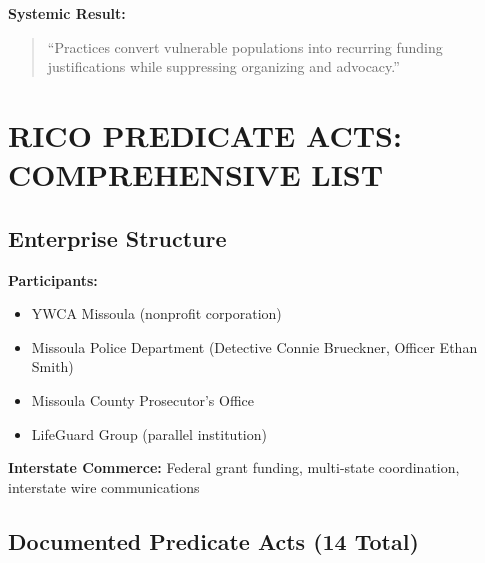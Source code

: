 \documentclass[11pt,letterpaper]{article}
\begin{document}
\textbf{Systemic Result:}
\begin{quote}
``Practices convert vulnerable populations into recurring funding justifications while suppressing organizing and advocacy.''
\end{quote}

\newpage

\section{RICO PREDICATE ACTS: COMPREHENSIVE LIST}

\subsection{Enterprise Structure}

\textbf{Participants:}
\begin{itemize}[leftmargin=*]
\item YWCA Missoula (nonprofit corporation)
\item Missoula Police Department (Detective Connie Brueckner, Officer Ethan Smith)
\item Missoula County Prosecutor's Office
\item LifeGuard Group (parallel institution)
\end{itemize}

\textbf{Interstate Commerce:} Federal grant funding, multi-state coordination, interstate wire communications

\subsection{Documented Predicate Acts (14 Total)}
\end{document}
